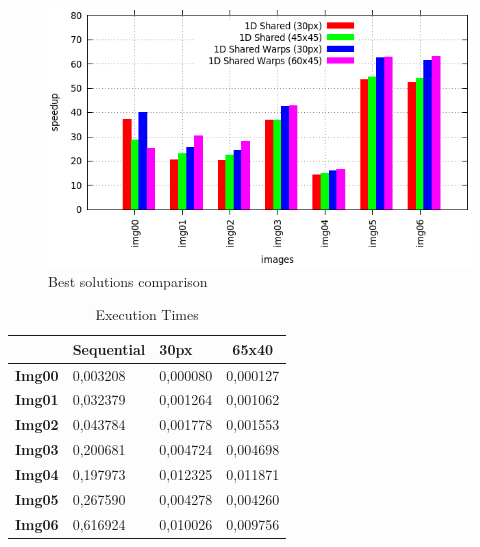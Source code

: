 \documentclass[a4paper]{article}
\begin{document}
\begin{figure}[!ht]
    \centering
    \includegraphics[width=0.7\linewidth]{res/new/histogram_more_confronto}
    \caption{Best solutions comparison}
    \label{fig:dbsc}
\end{figure}
\FloatBarrier

\begin{table}[!ht]
\centering
\label{tab:histo_exe}
\begin{tabular}{|l|l|l|l|}
\hline
\multicolumn{1}{|c|}{\textbf{}}      & \textbf{Sequential} & \textbf{30px}                 & \multicolumn{1}{c|}{\textbf{65x40}} \\ \hline
\multicolumn{1}{|c|}{\textbf{Img00}} & 0,003208            & \multicolumn{1}{c|}{0,000080} & \multicolumn{1}{c|}{0,000127}       \\ \hline
\textbf{Img01}                       & 0,032379            & 0,001264                      & 0,001062                            \\ \hline
\textbf{Img02}                       & 0,043784            & 0,001778                      & 0,001553                            \\ \hline
\textbf{Img03}                       & 0,200681            & 0,004724                      & 0,004698                            \\ \hline
\textbf{Img04}                       & 0,197973            & 0,012325                      & 0,011871                            \\ \hline
\textbf{Img05}                       & 0,267590            & 0,004278                      & 0,004260                            \\ \hline
\textbf{Img06}                       & 0,616924            & 0,010026                      & 0,009756                            \\ \hline
\end{tabular}
\caption{Execution Times}
\end{table}
\FloatBarrier
\end{document}
